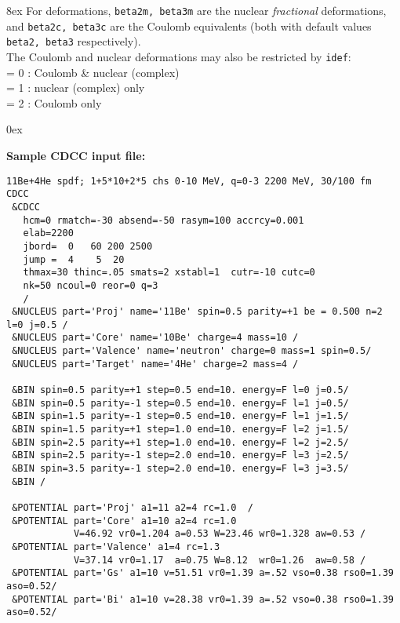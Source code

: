 \documentclass[11pt]{article}
\begin{document}
\hangindent 8ex
For deformations, {\tt beta2m, beta3m} are the nuclear {\em fractional}
deformations, and {\tt beta2c, beta3c} are the Coulomb equivalents (both with default
values  {\tt beta2, beta3} respectively).\\
The Coulomb and nuclear deformations may also be restricted by {\tt idef}:
\\   = 0 : Coulomb \& nuclear (complex)
\\  = 1 : nuclear (complex) only
\\  = 2 : Coulomb only

\hangindent 0ex


\newpage
\vspace{8mm}
{\bf Sample CDCC input file:}
\begin{verbatim}
11Be+4He spdf; 1+5*10+2*5 chs 0-10 MeV, q=0-3 2200 MeV, 30/100 fm
CDCC
 &CDCC
   hcm=0 rmatch=-30 absend=-50 rasym=100 accrcy=0.001
   elab=2200
   jbord=  0   60 200 2500
   jump =  4    5  20
   thmax=30 thinc=.05 smats=2 xstabl=1  cutr=-10 cutc=0
   nk=50 ncoul=0 reor=0 q=3
   /
 &NUCLEUS part='Proj' name='11Be' spin=0.5 parity=+1 be = 0.500 n=2 l=0 j=0.5 /
 &NUCLEUS part='Core' name='10Be' charge=4 mass=10 /
 &NUCLEUS part='Valence' name='neutron' charge=0 mass=1 spin=0.5/
 &NUCLEUS part='Target' name='4He' charge=2 mass=4 /

 &BIN spin=0.5 parity=+1 step=0.5 end=10. energy=F l=0 j=0.5/
 &BIN spin=0.5 parity=-1 step=0.5 end=10. energy=F l=1 j=0.5/
 &BIN spin=1.5 parity=-1 step=0.5 end=10. energy=F l=1 j=1.5/
 &BIN spin=1.5 parity=+1 step=1.0 end=10. energy=F l=2 j=1.5/
 &BIN spin=2.5 parity=+1 step=1.0 end=10. energy=F l=2 j=2.5/
 &BIN spin=2.5 parity=-1 step=2.0 end=10. energy=F l=3 j=2.5/
 &BIN spin=3.5 parity=-1 step=2.0 end=10. energy=F l=3 j=3.5/
 &BIN /

 &POTENTIAL part='Proj' a1=11 a2=4 rc=1.0  /
 &POTENTIAL part='Core' a1=10 a2=4 rc=1.0
            V=46.92 vr0=1.204 a=0.53 W=23.46 wr0=1.328 aw=0.53 /
 &POTENTIAL part='Valence' a1=4 rc=1.3
            V=37.14 vr0=1.17  a=0.75 W=8.12  wr0=1.26  aw=0.58 /
 &POTENTIAL part='Gs' a1=10 v=51.51 vr0=1.39 a=.52 vso=0.38 rso0=1.39 aso=0.52/
 &POTENTIAL part='Bi' a1=10 v=28.38 vr0=1.39 a=.52 vso=0.38 rso0=1.39 aso=0.52/
\end{verbatim}

\newpage

%
%
\end{document}
